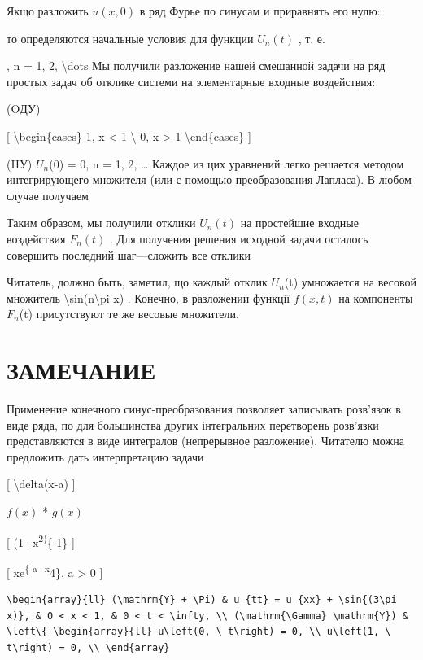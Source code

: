 \documentclass[
]{article}
\begin{document}
Якщо разложить \(u(x, 0)\) в ряд Фурье по синусам и приравнять его нулю:

то определяются начальные условия для функции \(U_n\left(t\right)\) , т.
е.

, n = 1, 2, \textbackslash dots Мы получили разложение нашей смешанной
задачи на ряд простых задач об отклике системи на элементарные входные
воздействия:

(OДУ)

{[} \textbackslash begin\{cases\} 1, \textbar x\textbar{} \textless{} 1
\textbackslash{} 0, \textbar x\textbar{} \textgreater{} 1
\textbackslash end\{cases\} {]}

(HУ) \(U_n\)(0) = 0, n = 1, 2, \ldots{} Каждое из цих уравнений легко
решается методом интегрирующего множителя (или с помощью преобразования
Лапласа). В любом случае получаем

Таким образом, мы получили отклики \(U_n(t)\) на простейшие входные
воздействия \(F_n(t)\) . Для получения решения исходной задачи осталось
совершить последний шаг---сложить все отклики

Читатель, должно быть, заметил, що каждый отклик \(U_n\)(t) умножается
на весовой множитель \textbackslash sin(n\textbackslash pi x) . Конечно,
в разложении функції \(f(x, t)\) на компоненты \(F_n\)(t) присутствуют
те же весовые множители.

\section{ЗАМЕЧАНИЕ}\label{ux437ux430ux43cux435ux447ux430ux43dux438ux435-1}

Применение конечного синус-преобразования позволяет записывать розв'язок
в виде ряда, по для большинства других інтегральних перетворень
розв'язки представляются в виде интегралов (непрерывное разложение).
Читателю можна предложить дать интерпретацию задачи

{[} \textbackslash delta(x-a) {]}

\(f(x)\) * \(g(x)\)

{[} (1+x\textsuperscript{2)}\{-1\} {]}

{[} xe\textsuperscript{\{-a+x}4\}, a \textgreater{} 0 {]}

\begin{verbatim}
\begin{array}{ll} (\mathrm{Y} + \Pi) & u_{tt} = u_{xx} + \sin{(3\pi x)}, & 0 < x < 1, & 0 < t < \infty, \\ (\mathrm{\Gamma} \mathrm{Y}) & \left\{ \begin{array}{ll} u\left(0, \ t\right) = 0, \\ u\left(1, \ t\right) = 0, \\ \end{array}
\end{verbatim}
\end{document}
